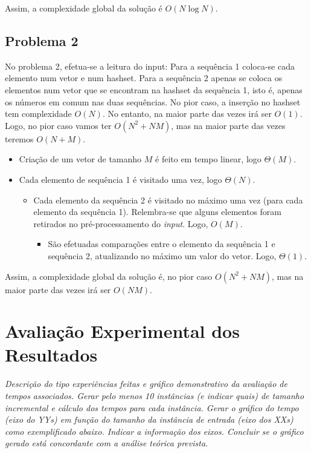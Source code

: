 \documentclass[12pt,a4paper]{article}
\begin{document}
  Assim, a complexidade global da solução é $O(N \log N)$.

  \subsection{Problema 2}

  No problema 2, efetua-se a leitura do input:
    Para a sequência 1 coloca-se cada elemento num vetor e num hashset.
    Para a sequência 2 apenas se coloca os elementos num vetor que se encontram na hashset da sequência 1, isto é, apenas os números em comum nas duas sequências.
  No pior caso, a inserção no hashset tem complexidade $O(N)$.
  No entanto, na maior parte das vezes irá ser $O(1)$.
  Logo, no pior caso vamos ter $O(N^2 + NM)$, mas na maior parte das vezes teremos $O(N + M)$.

  \begin{itemize}
    \item Criação de um vetor de tamanho $M$ é feito em tempo linear, logo $\Theta(M)$.
    \item Cada elemento de sequência 1 é visitado uma vez, logo $\Theta(N)$.
    \begin{itemize}
      \item Cada elemento da sequência 2 é visitado no máximo uma vez (para cada elemento da sequência 1). Relembra-se que alguns elementos foram retirados no pré-processamento do \textit{input}. Logo, $O(M)$.
      \begin{itemize}
        \item São efetuadas comparações entre o elemento da sequência 1 e sequência 2, atualizando no máximo um valor do vetor. Logo, $\Theta(1)$.
      \end{itemize}
    \end{itemize}
  \end{itemize}

  Assim, a complexidade global da solução é, no pior caso $O(N^2 + NM)$, mas na maior parte das vezes irá ser $O(NM)$.

  \section{Avaliação Experimental dos Resultados}

  \textit{Descrição do tipo experiências feitas e gráfico demonstrativo da avaliação de tempos associados.
  Gerar pelo menos 10 instâncias (e indicar quais) de tamanho incremental e cálculo dos tempos para cada instância.
  Gerar o gráfico do tempo (eixo do YYs) em função do tamanho da instância de entrada (eixo dos XXs) como exemplificado abaixo. Indicar a informação dos eixos. Concluir se o gráfico gerado está concordante com a análise teórica prevista.}
\end{document}
